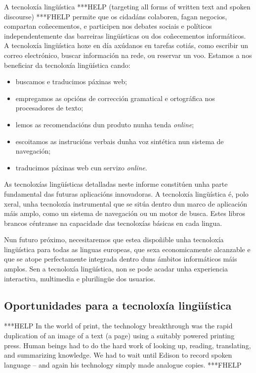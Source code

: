 \begin{multicols}{2}
A tecnoloxía lingüística ***HELP (targeting all forms of written text and spoken discourse) ***FHELP permite que os cidadáns colaboren, fagan negocios, compartan coñecementos, e participen nos debates sociais e políticos independentemente das barreiras lingüísticas ou dos coñecementos informáticos.  A tecnoloxía lingüística hoxe en día axúdanos en tarefas cotiás, como escribir un correo electrónico, buscar información na rede, ou reservar un voo. Estamos a nos beneficiar da tecnoloxía lingüística cando:
	\begin{itemize}
	   \item buscamos e traducimos páxinas web;  
	   \item empregamos as opcións de corrección gramatical e ortográfica nos procesadores de texto;
	   \item lemos as recomendacións dun produto nunha tenda \textit{online};
	   \item escoitamos as instrucións verbais dunha voz sintética nun sistema de navegación; 
	   \item traducimos páxinas web cun servizo \textit{online}.
	\end{itemize}
As tecnoloxías lingüísticas detalladas neste informe constitúen unha parte fundamental das futuras aplicacións innovadoras. A tecnoloxía lingüística é, polo xeral, unha tecnoloxía instrumental que se sitúa dentro dun marco de aplicación máis amplo, como un sistema de navegación ou un motor de busca. Estes libros brancos céntranse na capacidade das tecnoloxías básicas en cada lingua. 



Nun futuro próximo, necesitaremos que estea dispoñible unha tecnoloxía lingüística para todas as linguas europeas, que sexa economicamente alcanzable e que se atope perfectamente integrada dentro duns ámbitos informáticos máis amplos. Sen a tecnoloxía lingüística, non se pode acadar unha experiencia interactiva, multimedia e plurilingüe dos usuarios. 

\subsection{Oportunidades para a tecnoloxía lingüística}

 ***HELP
   In the world of print, the technology breakthrough was the rapid duplication of an image of a text (a page) using a suitably powered printing press. Human beings had to do the hard work of looking up, reading, translating, and summarizing knowledge. We had to wait until Edison to record spoken language – and again his technology simply made analogue copies. ***FHELP


\end{multicols}
